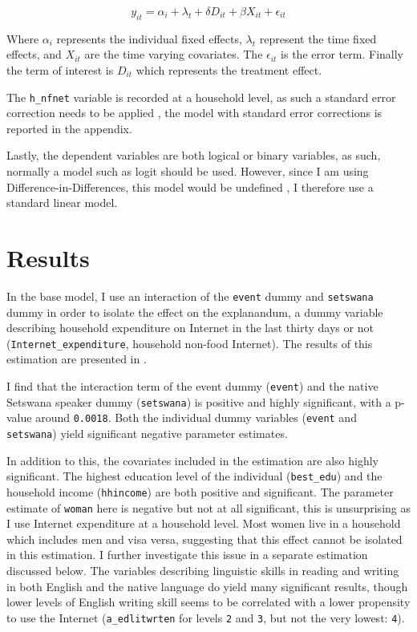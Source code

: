 \documentclass[a4paper,british]{article}\usepackage[]{graphicx}\usepackage[]{color}
\newcommand{\code}[1]{\texttt{#1}}
\begin{document}
\begin{equation}
y_{it}=\alpha_{i}+\lambda_{t}+\delta D{}_{it}+\beta X_{it}+\epsilon_{it}\label{eq:m1}
\end{equation}

Where $\alpha_{i}$ represents the individual fixed effects, $\lambda_{t}$
represent the time fixed effects, and $X_{it}$ are the time varying
covariates. The $\epsilon_{it}$ is the error term. Finally the term
of interest is $D_{it}$ which represents the treatment effect.

The \code{h\_nfnet} variable is recorded at a household level, as
such a standard error correction needs to be applied \citep{white1980heteroskedasticity},
the model with standard error corrections is reported in the appendix.

Lastly, the dependent variables are both logical or binary variables,
as such, normally a model such as logit should be used. However, since
I am using Difference-in-Differences, this model would be undefined
\citep{wooldridge2010econometric}, I therefore use a standard linear
model. 

\section{Results}

\label{sec:results}In the base model, I use an interaction of the
\code{event} dummy and \code{setswana} dummy in order to isolate
the effect on the explanandum, a dummy variable describing household
expenditure on Internet in the last thirty days or not (\code{Internet\_expenditure},
household non-food Internet). The results of this estimation are presented
in .

I find that the interaction term of the event dummy (\code{event})
and the native Setswana speaker dummy (\code{setswana}) is positive
and highly significant, with a p-value around \code{0.0018}. Both
the individual dummy variables (\code{event} and \code{setswana})
yield significant negative parameter estimates.

In addition to this, the covariates included in the estimation are
also highly significant. The highest education level of the individual
(\code{best\_edu}) and the household income (\code{hhincome}) are
both positive and significant. The parameter estimate of \code{woman}
here is negative but not at all significant, this is unsurprising
as I use Internet expenditure at a household level. Most women live
in a household which includes men and visa versa, suggesting that
this effect cannot be isolated in this estimation. I further investigate
this issue in a separate estimation discussed below. The variables
describing linguistic skills in reading and writing in both English
and the native language do yield many significant results, though
lower levels of English writing skill seems to be correlated with
a lower propensity to use the Internet (\code{a\_edlitwrten} for
levels \code{2} and \code{3}, but not the very lowest: \code{4}).
\end{document}
